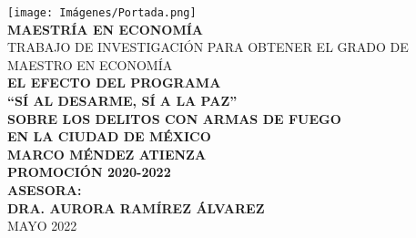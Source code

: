 
\begin{titlepage}
{\selectfont
	\begin{center}
		
		\texttt{[image: Imágenes/Portada.png]}\\[0.1in]
		
		\renewcommand{\baselinestretch}{1.5}
		\Large \textbf {MAESTRÍA EN ECONOMÍA}\\[0.025in]
		\large{TRABAJO DE INVESTIGACIÓN PARA OBTENER EL GRADO DE \\ MAESTRO EN ECONOMÍA}\\[0.3	in]
		
		\normalsize \textbf{ EL EFECTO DEL PROGRAMA \\ ``SÍ AL DESARME, SÍ A LA PAZ'' \\ SOBRE LOS DELITOS CON ARMAS DE FUEGO \\ EN LA CIUDAD DE MÉXICO}\\[0.3in]

		
		\normalsize \textbf{MARCO MÉNDEZ ATIENZA}\\[0.3in]
		
		\small \textbf{PROMOCIÓN 2020-2022}\\[0.4in]
		
		\small \textbf{ASESORA:}\\[0.4in]
		
		\small \textbf{DRA. AURORA RAMÍREZ ÁLVAREZ}\\[0.4in]
		
		\small MAYO 2022

	\end{center}

}


\end{titlepage}


